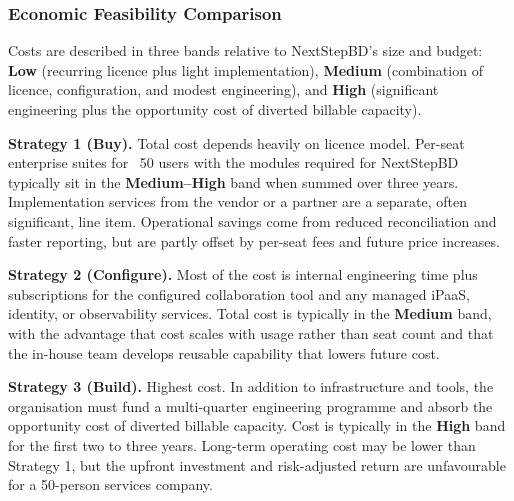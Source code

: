 \documentclass[12pt,a4paper]{report}
\begin{document}
\subsubsection{Economic Feasibility Comparison}
\label{sec:economic-comparison}

Costs are described in three bands relative to NextStepBD's size and budget:
\textbf{Low} (recurring licence plus light implementation), \textbf{Medium} (combination of
licence, configuration, and modest engineering), and \textbf{High} (significant engineering
plus the opportunity cost of diverted billable capacity).

\textbf{Strategy 1 (Buy).} Total cost depends heavily on licence model. Per-seat enterprise
suites for ~50 users with the modules required for NextStepBD typically sit in the
\textbf{Medium--High} band when summed over three years. Implementation services from the
vendor or a partner are a separate, often significant, line item. Operational savings come
from reduced reconciliation and faster reporting, but are partly offset by per-seat fees and
future price increases.

\textbf{Strategy 2 (Configure).} Most of the cost is internal engineering time plus
subscriptions for the configured collaboration tool and any managed iPaaS, identity, or
observability services. Total cost is typically in the \textbf{Medium} band, with the
advantage that cost scales with usage rather than seat count and that the in-house team
develops reusable capability that lowers future cost.

\textbf{Strategy 3 (Build).} Highest cost. In addition to infrastructure and tools, the
organisation must fund a multi-quarter engineering programme and absorb the opportunity cost
of diverted billable capacity. Cost is typically in the \textbf{High} band for the first two
to three years. Long-term operating cost may be lower than Strategy 1, but the upfront
investment and risk-adjusted return are unfavourable for a 50-person services company.
\end{document}

